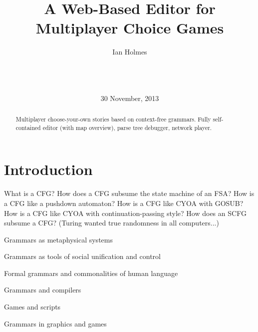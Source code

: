 \documentclass{acm_proc_article-sp}
\begin{document}
\title{A Web-Based Editor for Multiplayer Choice Games}
\author{
\alignauthor
Ian Holmes\\
       \\
       \\
       \\
}
\date{30 November, 2013}

\maketitle
\begin{abstract}
Multiplayer choose-your-own stories based on context-free grammars.
Fully self-contained editor (with map overview), parse tree debugger, network player.
\end{abstract}



\section{Introduction}

What is a CFG?
How does a CFG subsume the state machine of an FSA?
How is a CFG like a pushdown automaton?
How is a CFG like CYOA with GOSUB?
How is a CFG like CYOA with continuation-passing style?
How does an SCFG subsume a CFG? (Turing wanted true randomness in all computers...)

\cite{DBLP:conf/icalp/EtessamiWY08}

Grammars as metaphysical systems
\cite{SanskritSutras}
\cite{Priscian}

Grammars as tools of social unification and control
\cite{AcademieFrancaise}
\cite{RobertLowth}

Formal grammars and commonalities of human language
\cite{Chomsky}

Grammars and compilers
\cite{AhoLamSethiUllmanCompilersDragonBook}

Games and scripts
\cite{EricBerneGamesPeoplePlay,EricBerneWhatDoYouSayAfterYouSayHello}

Grammars in graphics and games
\cite{LSystems}
\cite{Sims3}
\end{document}
